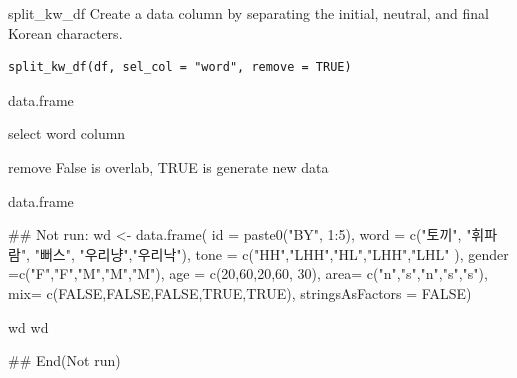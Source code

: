 \documentclass[a4paper]{book}
\begin{document}
%
\begin{Description}
split\_kw\_df Create a data column by separating the initial, neutral, and final Korean characters.
\end{Description}
%
\begin{Usage}
\begin{verbatim}
split_kw_df(df, sel_col = "word", remove = TRUE)
\end{verbatim}
\end{Usage}
%
\begin{Arguments}
\begin{ldescription}
\item[\code{df}] data.frame

\item[\code{sel\_col}] select word column

\item[\code{remove}] remove False is overlab, TRUE is generate new data
\end{ldescription}
\end{Arguments}
%
\begin{Value}
data.frame
\end{Value}
%
\begin{Examples}
\begin{ExampleCode}
\#\# Not run: 
wd <- data.frame(
id =  paste0("BY", 1:5),
word = c("토끼", "휘파람", "뻐스", "우리냥","우리낙"),
tone = c("HH","LHH","HL","LHH","LHL" ),
gender =c("F","F","M","M","M"),
age = c(20,60,20,60, 30),
area= c("n","s","n","s","s"),
mix= c(FALSE,FALSE,FALSE,TRUE,TRUE),
stringsAsFactors = FALSE)

wd%
wd%


## End(Not run)

\end{ExampleCode}
\end{Examples}
\end{document}
